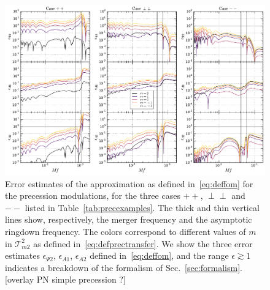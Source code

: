 \documentclass[aps,showpacs,twocolumn,
prd,superscriptaddress,nofootinbib]{revtex4-1}
\newcommand\calT{{\mathcal{T}}}
\newcommand{\SM}[1]{{\color{Red} #1}}
\begin{document}
\begin{figure}
  \centering
  \includegraphics[width=.98\linewidth]{plots/precfom_py.pdf}
  \caption{Error estimates of the approximation as defined in~\eqref{eq:deffom} for the precession modulations, for the three cases $++$, $\perp\perp$ and $--$ listed in Table~\ref{tab:precexamples}. The thick and thin vertical lines show, respectively, the merger frequency and the asymptotic ringdown frequency. The colors correspond to different values of $m$ in $\calT^{2}_{m 2}$ as defined in~\eqref{eq:defprectransfer}. We show the three error estimates $\epsilon_{\Psi 2}$, $\epsilon_{A1}$, $\epsilon_{A2}$ defined in~\eqref{eq:deffom}, and the range $\epsilon \gtrsim 1$ indicates a breakdown of the formalism of Sec.~\ref{sec:formalism}. \SM{[overlay PN simple precession ?]}}
  \label{fig:fomprec}
\end{figure}
\end{document}
